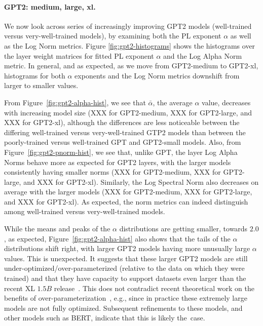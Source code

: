\paragraph{GPT2: medium, large, xl.} 

We now look across series of increasingly improving GPT2 models (well-trained versus very-well-trained models), by examining both the PL exponent $\alpha$ as well as the Log Norm metrics.  
Figure \ref{fig:gpt2-histograms} shows the histograms over the layer weight matrices for fitted PL exponent $\alpha$ and the Log Alpha Norm metric. 
In general, and as expected, as we move from GPT2-medium to GPT2-xl, histograms for both $\alpha$ exponents and the Log Norm metrics downshift from larger to smaller values. 

From Figure~\ref{fig:gpt2-alpha-hist}, we see that
$\bar{\alpha}$, the average $\alpha$ value, decreases with increasing model size (XXX for GPT2-medium, XXX for GPT2-large, and XXX for GPT2-xl), although the differences are less noticeable between the differing well-trained versus very-well-trained GTP2 models than between the poorly-trained versus well-trained GPT and GPT2-small models.
Also, from Figure~\ref{fig:gpt2-pnorm-hist}, we see that, 
unlike GPT, the layer Log Alpha Norms behave more as expected for GPT2 layers, with the larger models consistently having smaller norms (XXX for GPT2-medium, XXX for GPT2-large, and XXX for GPT2-xl). 
Similarly, the Log Spectral Norm also decreases on average with the larger models (XXX for GPT2-medium, XXX for GPT2-large, and XXX for GPT2-xl).
As expected, the norm metrics can indeed distinguish among well-trained versus very-well-trained models.

While the means and peaks of the $\alpha$ distributions are getting smaller, towards $2.0$, as expected, Figure~\ref{fig:gpt2-alpha-hist} also shows that the tails of the $\alpha$ distributions shift right, with larger GPT2 models having more unusually large $\alpha$ values.
This is unexpected.
It suggests that these larger GPT2 models are still under-optimized/over-parameterized (relative to the data on which they were trained) and that they have capacity to support datasets even larger than the recent XL $1.5B$ release~\cite{gpt2-xl}.
This does not contradict recent theoretical work on the benefits of over-parameterization~\cite{BHMM19}, e.g., since in practice these extremely large models are not fully optimized.
Subsequent refinements to these models, and other models such as BERT, indicate that this is likely the~case.

